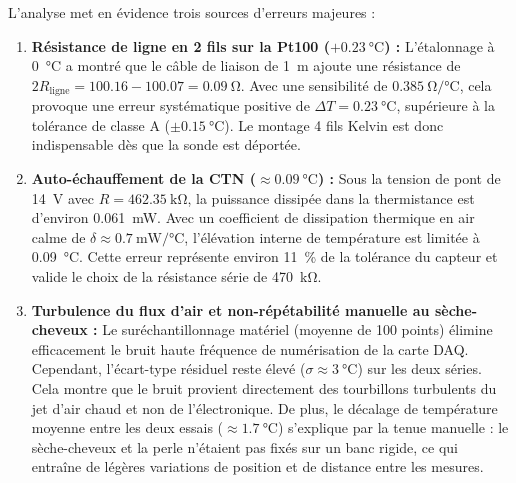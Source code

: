 L'analyse met en évidence trois sources d'erreurs majeures :
\begin{enumerate}[leftmargin=1.2cm]
    \item \textbf{Résistance de ligne en 2 fils sur la Pt100 ($+\qty{0.23}{\degreeCelsius}$) :} L'étalonnage à \qty{0}{\degreeCelsius} a montré que le câble de liaison de \qty{1}{\meter} ajoute une résistance de $2 R_{\text{ligne}} = 100.16 - 100.07 = \qty{0.09}{\ohm}$. Avec une sensibilité de $\qty{0.385}{\ohm\per\degreeCelsius}$, cela provoque une erreur systématique positive de $\Delta T = \qty{+0.23}{\degreeCelsius}$, supérieure à la tolérance de classe A ($\pm \qty{0.15}{\degreeCelsius}$). Le montage 4 fils Kelvin est donc indispensable dès que la sonde est déportée.
    \item \textbf{Auto-échauffement de la CTN ($\approx \qty{0.09}{\degreeCelsius}$) :} Sous la tension de pont de \qty{14}{\volt} avec $R = \qty{462.35}{\kilo\ohm}$, la puissance dissipée dans la thermistance est d'environ \qty{0.061}{\milli\watt}. Avec un coefficient de dissipation thermique en air calme de $\delta \approx \qty{0.7}{\milli\watt\per\degreeCelsius}$, l'élévation interne de température est limitée à \qty{0.09}{\degreeCelsius}. Cette erreur représente environ \qty{11}{\percent} de la tolérance du capteur et valide le choix de la résistance série de \qty{470}{\kilo\ohm}.
    \item \textbf{Turbulence du flux d'air et non-répétabilité manuelle au sèche-cheveux :} 
    Le suréchantillonnage matériel (moyenne de 100 points) élimine efficacement le bruit haute fréquence de numérisation de la carte DAQ. Cependant, l'écart-type résiduel reste élevé ($\sigma \approx \qty{3}{\degreeCelsius}$) sur les deux séries. Cela montre que le bruit provient directement des tourbillons turbulents du jet d'air chaud et non de l'électronique.
    De plus, le décalage de température moyenne entre les deux essais ($\approx \qty{1.7}{\degreeCelsius}$) s'explique par la tenue manuelle : le sèche-cheveux et la perle n'étaient pas fixés sur un banc rigide, ce qui entraîne de légères variations de position et de distance entre les mesures.
\end{enumerate}
